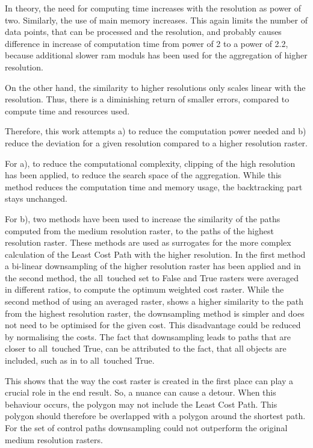 In theory, the need for computing time increases with the resolution as power of two. 
Similarly, the use of main memory increases. 
This again limits the number of data points, that can be processed and the resolution, and probably causes difference in increase of computation time from power of 2 to a power of 2.2, because additional slower ram moduls has been used for the aggregation of higher resolution.

On the other hand, the similarity to higher resolutions only scales linear with the resolution. 
Thus, there is a diminishing return of smaller errors, compared to compute time and resources used.

Therefore, this work attempts a) to reduce the computation power needed and b) reduce the deviation for a given resolution compared to a higher resolution raster.

For a), to reduce the computational complexity, clipping of the high resolution has been applied, to reduce the search space of the aggregation.
While this method reduces the computation time and memory usage, the backtracking part stays unchanged.

For b), two methods have been used to increase the similarity of the paths computed from the medium resolution raster, to the paths of the highest resolution raster.
These methods are used as surrogates for the more complex calculation of the Least Cost Path with the higher resolution.
In the first method a bi-linear downsampling of the higher resolution raster has been applied and in the second method, the all~touched set to False and True rasters were averaged in different ratios, to compute the optimum weighted cost raster.
While the second method of using an averaged raster, shows a higher similarity to the path from the highest resolution raster, the downsampling method is simpler and does not need to be optimised for the given cost.
This disadvantage could be reduced by normalising the costs.
The fact that downsampling leads to paths that are closer to all~touched True, can be attributed to the fact, that all objects are included, such as in to all~touched True.

This shows that the way the cost raster is created in the first place can play a crucial role in the end result.
So, a nuance can cause a detour.
When this behaviour occurs, the polygon may not include the Least Cost Path.
This polygon should therefore be overlapped with a polygon around the shortest path.
For the set of control paths downsampling could not outperform the original medium resolution rasters.

